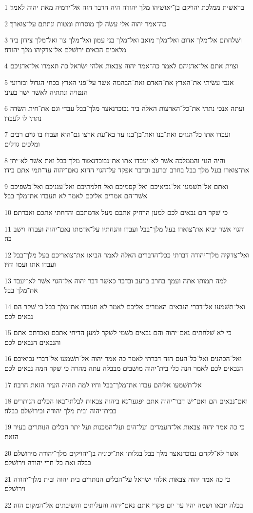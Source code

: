 \par 1 בראשׁית ממלכת יהויקם בן־יאושׁיהו מלך יהודה היה הדבר הזה אל־ירמיה מאת יהוה לאמר׃
\par 2 כה־אמר יהוה אלי עשׂה לך מוסרות ומטות ונתתם על־צוארך׃
\par 3 ושׁלחתם אל־מלך אדום ואל־מלך מואב ואל־מלך בני עמון ואל־מלך צר ואל־מלך צידון ביד מלאכים הבאים ירושׁלם אל־צדקיהו מלך יהודה׃
\par 4 וצוית אתם אל־אדניהם לאמר כה־אמר יהוה צבאות אלהי ישׂראל כה תאמרו אל־אדניכם׃
\par 5 אנכי עשׂיתי את־הארץ את־האדם ואת־הבהמה אשׁר על־פני הארץ בכחי הגדול ובזרועי הנטויה ונתתיה לאשׁר ישׁר בעיני׃
\par 6 ועתה אנכי נתתי את־כל־הארצות האלה ביד נבוכדנאצר מלך־בבל עבדי וגם את־חית השׂדה נתתי לו לעבדו׃
\par 7 ועבדו אתו כל־הגוים ואת־בנו ואת־בן־בנו עד בא־עת ארצו גם־הוא ועבדו בו גוים רבים ומלכים גדלים׃
\par 8 והיה הגוי והממלכה אשׁר לא־יעבדו אתו את־נבוכדנאצר מלך־בבל ואת אשׁר לא־יתן את־צוארו בעל מלך בבל בחרב וברעב ובדבר אפקד על־הגוי ההוא נאם־יהוה עד־תמי אתם בידו׃
\par 9 ואתם אל־תשׁמעו אל־נביאיכם ואל־קסמיכם ואל חלמתיכם ואל־ענניכם ואל־כשׁפיכם אשׁר־הם אמרים אליכם לאמר לא תעבדו את־מלך בבל׃
\par 10 כי שׁקר הם נבאים לכם למען הרחיק אתכם מעל אדמתכם והדחתי אתכם ואבדתם׃
\par 11 והגוי אשׁר יביא את־צוארו בעל מלך־בבל ועבדו והנחתיו על־אדמתו נאם־יהוה ועבדה וישׁב בה׃
\par 12 ואל־צדקיה מלך־יהודה דברתי ככל־הדברים האלה לאמר הביאו את־צואריכם בעל מלך־בבל ועבדו אתו ועמו וחיו׃
\par 13 למה תמותו אתה ועמך בחרב ברעב ובדבר כאשׁר דבר יהוה אל־הגוי אשׁר לא־יעבד את־מלך בבל׃
\par 14 ואל־תשׁמעו אל־דברי הנבאים האמרים אליכם לאמר לא תעבדו את־מלך בבל כי שׁקר הם נבאים לכם׃
\par 15 כי לא שׁלחתים נאם־יהוה והם נבאים בשׁמי לשׁקר למען הדיחי אתכם ואבדתם אתם והנבאים הנבאים לכם׃
\par 16 ואל־הכהנים ואל־כל־העם הזה דברתי לאמר כה אמר יהוה אל־תשׁמעו אל־דברי נביאיכם הנבאים לכם לאמר הנה כלי בית־יהוה מושׁבים מבבלה עתה מהרה כי שׁקר המה נבאים לכם׃
\par 17 אל־תשׁמעו אליהם עבדו את־מלך־בבל וחיו למה תהיה העיר הזאת חרבה׃
\par 18 ואם־נבאים הם ואם־ישׁ דבר־יהוה אתם יפגעו־נא ביהוה צבאות לבלתי־באו הכלים הנותרים בבית־יהוה ובית מלך יהודה ובירושׁלם בבלה׃
\par 19 כי כה אמר יהוה צבאות אל־העמדים ועל־הים ועל־המכנות ועל יתר הכלים הנותרים בעיר הזאת׃
\par 20 אשׁר לא־לקחם נבוכדנאצר מלך בבל בגלותו את־יכוניה בן־יהויקים מלך־יהודה מירושׁלם בבלה ואת כל־חרי יהודה וירושׁלם׃
\par 21 כי כה אמר יהוה צבאות אלהי ישׂראל על־הכלים הנותרים בית יהוה ובית מלך־יהודה וירושׁלם׃
\par 22 בבלה יובאו ושׁמה יהיו עד יום פקדי אתם נאם־יהוה והעליתים והשׁיבתים אל־המקום הזה׃

